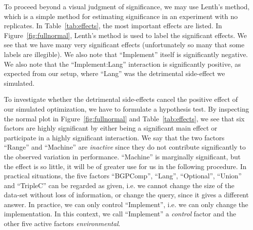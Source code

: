 \documentclass{llncs}
\begin{document}
To proceed beyond a visual judgment of significance, we may use
Lenth's method\cite{lenthmethod}, which is a simple method for
estimating significance in an experiment with no replicates. In
Table~\ref{tab:effects}, the most important effects are listed.  In
Figure~\ref{fig:fullnormal}, Lenth's method is used to label the
significant effects. We see that we have many very significant effects
(unfortunately so many that some labels are illegible). We also note that
``Implement'' itself is significantly negative. We also note that the
``Implement:Lang'' interaction is significantly positive, as expected
from our setup, where ``Lang'' was the detrimental side-effect we
simulated.


To investigate whether the detrimental side-effects cancel the
positive effect of our simulated optimization, we have to formulate a
hypothesis test. By inspecting the normal plot in
Figure~\ref{fig:fullnormal} and Table~\ref{tab:effects}, we see that
six factors are highly significant by either being a significant main
effect or participate in a highly significant interaction. We say that
the two factors ``Range'' and ``Machine'' are \emph{inactive} since
they do not contribute significantly to the observed variation in
performance. ``Machine'' is marginally significant, but the effect is
so little, it will be of greater use for us in the following procedure. In
practical situations, the five factors ``BGPComp'', ``Lang'',
``Optional'', ``Union'' and ``TripleC'' can be regarded as given,
i.e. we cannot change the size of the data-set without loss of
information, or change the query, since it gives a different
answer. In practice, we can only control ``Implement'', i.e. we can
only change the implementation. In this context, we call ``Implement''
a \emph{control} factor and the other five active factors
\emph{environmental}.
\end{document}
